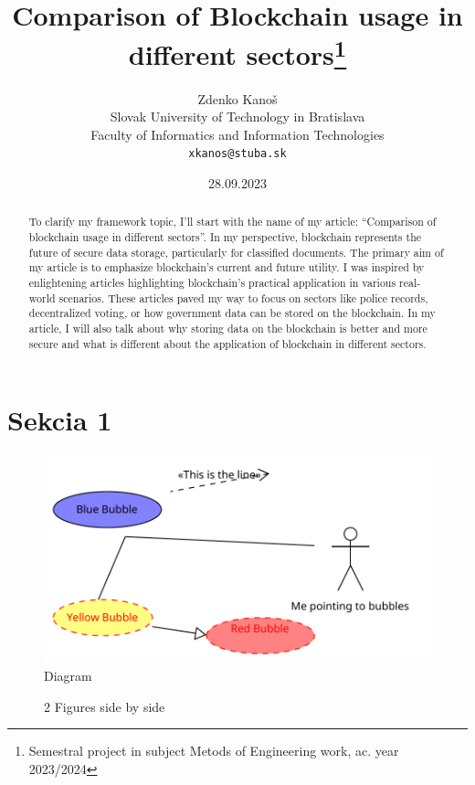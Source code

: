 \documentclass[10pt,english,a4paper]{article}
\title{Comparison of Blockchain usage in different sectors\thanks{Semestral project in subject Metods of Engineering work, ac. year 2023/2024}} %
\author{Zdenko Kanoš\\[2pt]
	{\small Slovak University of Technology in Bratislava}\\
	{\small Faculty of Informatics and Information Technologies}\\
	{\small \texttt{xkanos@stuba.sk}}
	}
\date{\small 28.09.2023} %
\begin{document}
\maketitle

\begin{abstract}
To clarify my framework topic, I'll start with the name of my article: “Comparison of
blockchain usage in different sectors”. In my perspective, blockchain represents the future
of secure data storage, particularly for classified documents. The primary aim of my article is
to emphasize blockchain’s current and future utility. I was inspired by enlightening articles
highlighting blockchain's practical application in various real-world scenarios. These articles
paved my way to focus on sectors like police records, decentralized voting, or how
government data can be stored on the blockchain. In my article, I will also talk about why
storing data on the blockchain is better and more secure and what is different about the
application of blockchain in different sectors.
\end{abstract}

\section{Sekcia 1}
 \lipsum[1-3]
  \begin{figure}
  \centering
   \includegraphics[scale=0.8]{Diagram_1.pdf}
  \centering
  \caption{Diagram}
 \end{figure}
 \lipsum[1-2]
 
 \begin{figure}%
    \centering
    \qquad
    \caption{2 Figures side by side}%
    \label{fig:example}%
\end{figure}
 
\end{document}
